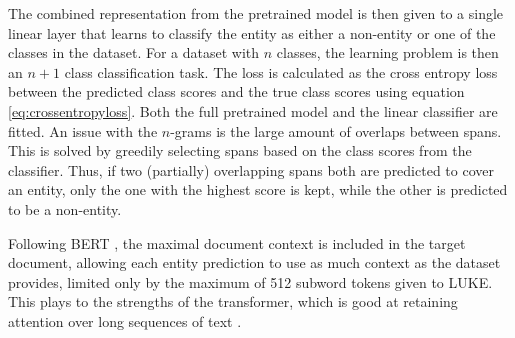 \documentclass[main.tex]{subfiles}
\begin{document}
The combined representation from the pretrained model is then given to a single linear layer that learns to classify the entity as either a non-entity or one of the classes in the dataset.
For a dataset with $ n $ classes, the learning problem is then an $ n+1 $ class classification task.
The loss is calculated as the cross entropy loss between the predicted class scores and the true class scores using equation \eqref{eq:crossentropyloss}.
Both the full pretrained model and the linear classifier are fitted.
An issue with the $ n $-grams is the large amount of overlaps between spans.
This is solved by greedily selecting spans based on the class scores from the classifier.
Thus, if two (partially) overlapping spans both are predicted to cover an entity, only the one with the highest score is kept, while the other is predicted to be a non-entity.

Following BERT \cite{devlin2019bert}, the maximal document context is included in the target document, allowing each entity prediction to use as much context as the dataset provides, limited only by the maximum of 512 subword tokens given to LUKE.
This plays to the strengths of the transformer, which is good at retaining attention over long sequences of text \cite{vaswani2017att}.
\cite{yamada2020luke}
\end{document}
